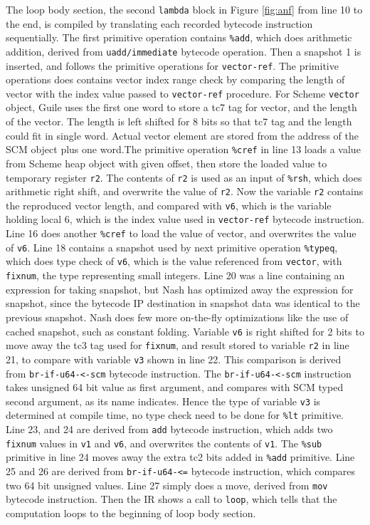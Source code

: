 \documentclass[preprint, numbers]{sigplanconf}
\begin{document}
The loop body section, the second \texttt{lambda} block in Figure
\hyperref[fig:anf]{\ref{fig:anf}} from line 10 to the end, is compiled by
translating each recorded bytecode instruction sequentially. The first
primitive operation contains \texttt{\%add}, which does arithmetic addition,
derived from \texttt{uadd/immediate} bytecode operation. Then a snapshot 1 is
inserted, and follows the primitive operations for \texttt{vector-ref}. The
primitive operations does contains vector index range check by comparing the
length of vector with the index value passed to \texttt{vector-ref}
procedure. For Scheme \texttt{vector} object, Guile uses the first one word to
store a tc7 tag for vector, and the length of the vector. The length is left
shifted for 8 bits so that tc7 tag and the length could fit in single
word. Actual vector element are stored from the address of the SCM object plus
one word.\@ The primitive operation \texttt{\%cref} in line 13 loads a value
from Scheme heap object with given offset, then store the loaded value to
temporary register \texttt{r2}. The contents of \texttt{r2} is used as an
input of \texttt{\%rsh}, which does arithmetic right shift, and overwrite the
value of \texttt{r2}. Now the variable \texttt{r2} contains the reproduced
vector length, and compared with \texttt{v6}, which is the variable holding
local 6, which is the index value used in \texttt{vector-ref} bytecode
instruction. Line 16 does another \texttt{\%cref} to load the value of vector,
and overwrites the value of \texttt{v6}. Line 18 contains a snapshot used by
next primitive operation \texttt{\%typeq}, which does type check of
\texttt{v6}, which is the value referenced from \texttt{vector}, with
\texttt{fixnum}, the type representing small integers. Line 20 was a line
containing an expression for taking snapshot, but Nash has optimized away the
expression for snapshot, since the bytecode IP destination in snapshot data
was identical to the previous snapshot. Nash does few more on-the-fly
optimizations like the use of cached snapshot, such as constant
folding. Variable \texttt{v6} is right shifted for 2 bits to move away the tc3
tag used for \texttt{fixnum}, and result stored to variable \texttt{r2} in
line 21, to compare with variable \texttt{v3} shown in line 22. This
comparison is derived from \texttt{br-if-u64-<-scm} bytecode instruction. The
\texttt{br-if-u64-<-scm} instruction takes unsigned 64 bit value as first
argument, and compares with SCM typed second argument, as its name indicates.
Hence the type of variable \texttt{v3} is determined at compile time, no type
check need to be done for \texttt{\%lt} primitive. Line 23, and 24 are derived
from \texttt{add} bytecode instruction, which adds two \texttt{fixnum} values
in \texttt{v1} and \texttt{v6}, and overwrites the contents of
\texttt{v1}. The \texttt{\%sub} primitive in line 24 moves away the extra tc2
bits added in \texttt{\%add} primitive. Line 25 and 26 are derived from
\texttt{br-if-u64-<=} bytecode instruction, which compares two 64 bit unsigned
values. Line 27 simply does a move, derived from \texttt{mov} bytecode
instruction. Then the IR shows a call to \texttt{loop}, which tells that the
computation loops to the beginning of loop body section.
\end{document}

